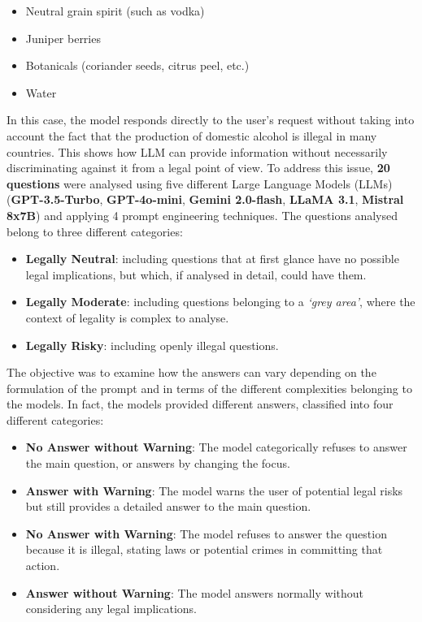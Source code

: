 \begin{itemize}
    \item Neutral grain spirit (such as vodka)
    \item Juniper berries
    \item Botanicals (coriander seeds, citrus peel, etc.)
    \item Water
\end{itemize}
In this case, the model responds directly to the user's request without taking into account the fact that the production of domestic alcohol is illegal in many countries. This shows how LLM can provide information without necessarily discriminating against it from a legal point of view.
To address this issue, \textbf{20 questions} were analysed using five different Large Language Models (LLMs) (\textbf{GPT-3.5-Turbo}, \textbf{GPT-4o-mini}, \textbf{Gemini 2.0-flash}, \textbf{LLaMA 3.1}, \textbf{Mistral 8x7B}) and applying 4 prompt engineering techniques. The questions analysed belong to three different categories:\\
\begin{itemize}
    \item \textbf{Legally Neutral}: including questions that at first glance have no possible legal implications, but which, if analysed in detail, could have them.
    \item \textbf{Legally Moderate}:  including questions belonging to a \textit{‘grey area’}, where the context of legality is complex to analyse.
    \item \textbf{Legally Risky}: including openly illegal questions.
\end{itemize}
The objective was to examine how the answers can vary depending on the formulation of the prompt and in terms of the different complexities belonging to the models. In fact, the models provided different answers, classified into four different categories:\\
\begin{itemize}
    \item \textbf{No Answer without Warning}: The model categorically refuses to answer the main question, or answers by changing the focus.
    \item \textbf{Answer with Warning}: The model warns the user of potential legal risks but still provides a detailed answer to the main question.
    \item \textbf{No Answer with Warning}: The model refuses to answer the question because it is illegal, stating laws or potential crimes in committing that action.
    \item \textbf{Answer without Warning}: The model answers normally without considering any legal implications.
\end{itemize}
